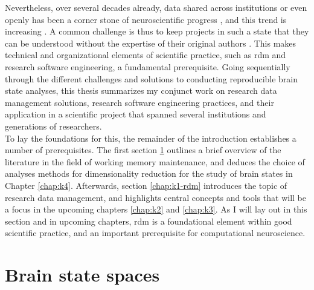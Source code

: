 Nevertheless, over several decades already, data shared across institutions or even openly has been a corner stone of neuroscientific progress \citep[e.g.,][]{ferguson2014big, niso2016omega}, and this trend is increasing \citep{gorgolewski2016practical}.
A common challenge is thus to keep projects in such a state that they can be understood without the expertise of their original authors \citep{puce2017review}.
This makes technical and organizational elements of scientific practice, such as \gls{rdm} and research software engineering, a fundamental prerequisite.
Going sequentially through the different challenges and solutions to conducting reproducible brain state analyses, this thesis summarizes my conjunct work on research data management solutions, research software engineering practices, and their application in a scientific project that spanned several institutions and generations of researchers.\\
To lay the foundations for this, the remainder of the introduction establishes a number of prerequisites.
The first section \ref{chap:k1-brain} outlines a brief overview of the literature in the field of working memory maintenance, and deduces the choice of analyses methods for dimensionality reduction for the study of brain states in Chapter \ref{chap:k4}.
Afterwards, section \ref{chap:k1-rdm} introduces the topic of research data management, and highlights central concepts and tools that will be a focus in the upcoming chapters \ref{chap:k2} and \ref{chap:k3}.
As I will lay out in this section and in upcoming chapters, \gls{rdm} is a foundational element within good scientific practice, and an important prerequisite for computational neuroscience.

\section{Brain state spaces}
\label{chap:k1-brain}

